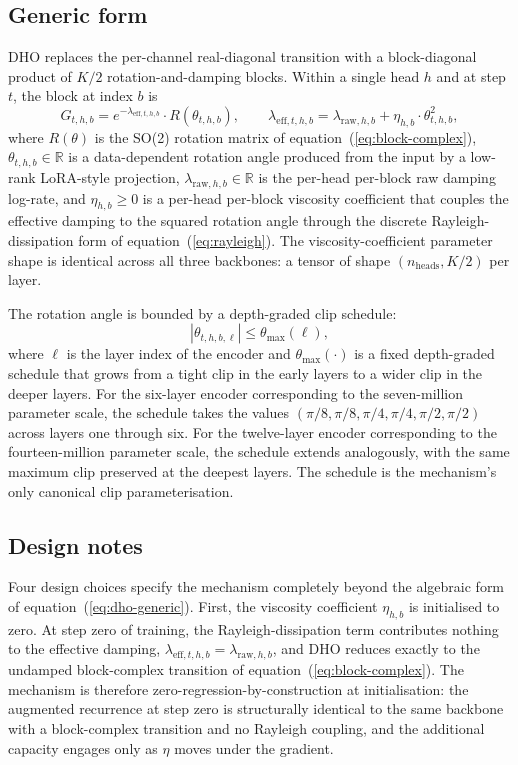 \subsection{Generic form}

DHO replaces the per-channel real-diagonal transition with a
block-diagonal product of $K/2$ rotation-and-damping blocks. Within
a single head $h$ and at step $t$, the block at index $b$ is
\begin{equation}\label{eq:dho-generic}
G_{t, h, b} = e^{-\lambda_{\mathrm{eff}, t, h, b}} \cdot R(\theta_{t, h, b}),
\qquad
\lambda_{\mathrm{eff}, t, h, b} = \lambda_{\mathrm{raw}, h, b} + \eta_{h, b} \cdot \theta_{t, h, b}^{2},
\end{equation}
where $R(\theta)$ is the SO(2) rotation matrix of
equation~(\ref{eq:block-complex}), $\theta_{t, h, b} \in \mathbb{R}$
is a data-dependent rotation angle produced from the input by a
low-rank LoRA-style projection, $\lambda_{\mathrm{raw}, h, b} \in \mathbb{R}$
is the per-head per-block raw damping log-rate, and
$\eta_{h, b} \ge 0$ is a per-head per-block viscosity coefficient
that couples the effective damping to the squared rotation angle
through the discrete Rayleigh-dissipation form of
equation~(\ref{eq:rayleigh}). The viscosity-coefficient parameter
shape is identical across all three backbones: a tensor of shape
$(n_{\mathrm{heads}}, K/2)$ per layer.

The rotation angle is bounded by a depth-graded clip schedule:
\begin{equation}\label{eq:dho-clip}
|\theta_{t, h, b, \ell}| \le \theta_{\max}(\ell),
\end{equation}
where $\ell$ is the layer index of the encoder and
$\theta_{\max}(\cdot)$ is a fixed depth-graded schedule that grows
from a tight clip in the early layers to a wider clip in the deeper
layers. For the six-layer encoder corresponding to the seven-million
parameter scale, the schedule takes the values
$(\pi/8, \pi/8, \pi/4, \pi/4, \pi/2, \pi/2)$ across layers one
through six. For the twelve-layer encoder corresponding to the
fourteen-million parameter scale, the schedule extends analogously,
with the same maximum clip preserved at the deepest layers. The
schedule is the mechanism's only canonical clip parameterisation.

\subsection{Design notes}

Four design choices specify the mechanism completely beyond the
algebraic form of equation~(\ref{eq:dho-generic}). First, the
viscosity coefficient $\eta_{h, b}$ is initialised to zero. At step
zero of training, the Rayleigh-dissipation term contributes nothing
to the effective damping,
$\lambda_{\mathrm{eff}, t, h, b} = \lambda_{\mathrm{raw}, h, b}$,
and DHO reduces exactly to the undamped block-complex transition of
equation~(\ref{eq:block-complex}). The mechanism is therefore
zero-regression-by-construction at initialisation: the augmented
recurrence at step zero is structurally identical to the same
backbone with a block-complex transition and no Rayleigh coupling,
and the additional capacity engages only as $\eta$ moves under the
gradient.

